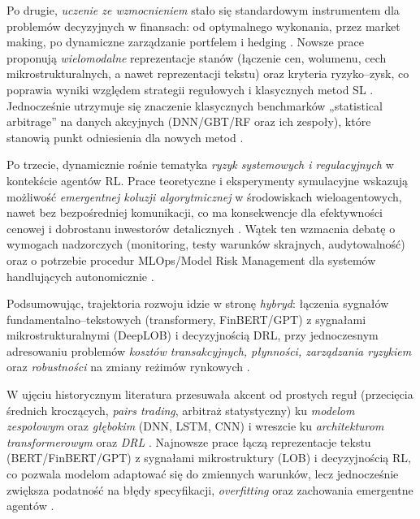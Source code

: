 Po drugie, \emph{uczenie ze wzmocnieniem} stało się standardowym instrumentem dla problemów decyzyjnych w finansach: od optymalnego wykonania, przez market making, po dynamiczne zarządzanie portfelem i hedging \parencite{hambly2023}. Nowsze prace proponują \emph{wielomodalne} reprezentacje stanów (łączenie cen, wolumenu, cech mikrostrukturalnych, a nawet reprezentacji tekstu) oraz kryteria ryzyko–zysk, co poprawia wyniki względem strategii regułowych i klasycznych metod SL \parencite{avramelou2024}. Jednocześnie utrzymuje się znaczenie klasycznych benchmarków „statistical arbitrage” na danych akcyjnych (DNN/GBT/RF oraz ich zespoły), które stanowią punkt odniesienia dla nowych metod \parencite{krauss2017}.

Po trzecie, dynamicznie rośnie tematyka \emph{ryzyk systemowych i regulacyjnych} w kontekście agentów RL. Prace teoretyczne i eksperymenty symulacyjne wskazują możliwość \emph{emergentnej koluzji algorytmicznej} w środowiskach wieloagentowych, nawet bez bezpośredniej komunikacji, co ma konsekwencje dla efektywności cenowej i dobrostanu inwestorów detalicznych \parencite{dou2025}. Wątek ten wzmacnia debatę o wymogach nadzorczych (monitoring, testy warunków skrajnych, audytowalność) oraz o potrzebie procedur MLOps/Model Risk Management dla systemów handlujących autonomicznie \parencite{hambly2023, vancsura2025}.

Podsumowując, trajektoria rozwoju idzie w stronę \emph{hybryd}: łączenia sygnałów fundamentalno–tekstowych (transformery, FinBERT/GPT) z sygnałami mikrostrukturalnymi (DeepLOB) i decyzyjnością DRL, przy jednoczesnym adresowaniu problemów \emph{kosztów transakcyjnych, płynności, zarządzania ryzykiem} oraz \emph{robustności} na zmiany reżimów rynkowych \parencite{zexin2021, hambly2023, zhang2019, avramelou2024, vancsura2025}.

W ujęciu historycznym literatura przesuwała akcent od prostych reguł (przecięcia średnich kroczących, \emph{pairs trading}, arbitraż statystyczny) ku \emph{modelom zespołowym} oraz \emph{głębokim} (DNN, LSTM, CNN) i wreszcie ku \emph{architekturom transformerowym} oraz \emph{DRL} \parencite{krauss2017, zexin2021, hambly2023}. Najnowsze prace łączą reprezentacje tekstu (BERT/FinBERT/GPT) z sygnałami mikrostruktury (LOB) i decyzyjnością RL, co pozwala modelom adaptować się do zmiennych warunków, lecz jednocześnie zwiększa podatność na błędy specyfikacji, \emph{overfitting} oraz zachowania emergentne agentów \parencite{zhang2019, dou2025}. 

